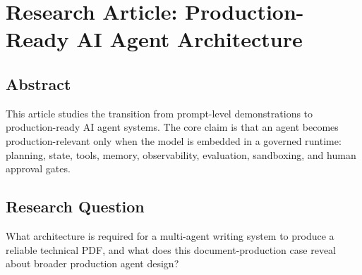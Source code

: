 \chapter{Research Article: Production-Ready AI Agent Architecture}
\section{Abstract}
This article studies the transition from prompt-level demonstrations to production-ready AI agent systems. The core claim is that an agent becomes production-relevant only when the model is embedded in a governed runtime: planning, state, tools, memory, observability, evaluation, sandboxing, and human approval gates.

\section{Research Question}
What architecture is required for a multi-agent writing system to produce a reliable technical PDF, and what does this document-production case reveal about broader production agent design?
